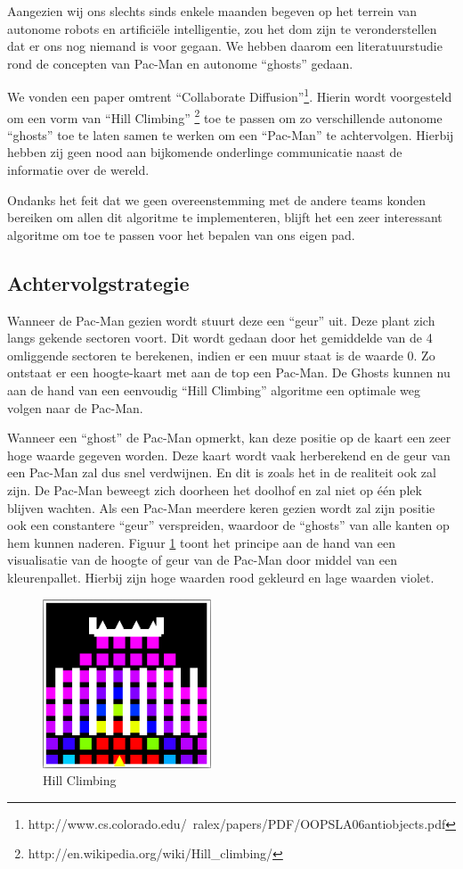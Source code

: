 \documentclass[12pt,a4paper]{report}
\begin{document}
Aangezien wij ons slechts sinds enkele maanden begeven op het terrein van autonome robots en artifici\"ele intelligentie, zou het dom zijn te veronderstellen dat er ons nog niemand is voor gegaan. We hebben daarom een literatuurstudie rond de concepten van Pac-Man en autonome ``ghosts'' gedaan.

We vonden een paper omtrent ``Collaborate Diffusion''\footnote{http://www.cs.colorado.edu/~ralex/papers/PDF/OOPSLA06antiobjects.pdf}. Hierin wordt voorgesteld om een vorm van ``Hill Climbing'' \footnote{http://en.wikipedia.org/wiki/Hill\_climbing/} toe te passen om zo verschillende autonome ``ghosts'' toe te laten samen te werken om een ``Pac-Man'' te achtervolgen. Hierbij hebben zij geen nood aan bijkomende onderlinge communicatie naast de informatie over de wereld.

Ondanks het feit dat we geen overeenstemming met de andere teams konden bereiken om allen dit algoritme te implementeren, blijft het een zeer interessant algoritme om toe te passen voor het bepalen van ons eigen pad.

\subsection{Achtervolgstrategie}

Wanneer de Pac-Man gezien wordt stuurt deze een ``geur'' uit. Deze plant zich langs gekende sectoren voort. Dit wordt gedaan door het gemiddelde van de 4 omliggende sectoren te berekenen, indien er een muur staat is de waarde 0. Zo ontstaat er een hoogte-kaart met aan de top een Pac-Man. De Ghosts kunnen nu aan de hand van een eenvoudig ``Hill Climbing'' algoritme een optimale weg volgen naar de Pac-Man.

Wanneer een ``ghost'' de Pac-Man opmerkt, kan deze positie op de kaart een zeer hoge waarde gegeven worden. Deze kaart wordt vaak herberekend en de geur van een Pac-Man zal dus snel verdwijnen. En dit is zoals het in de realiteit ook zal zijn. De Pac-Man beweegt zich doorheen het doolhof en zal niet op \'e\'en plek blijven wachten. Als een Pac-Man meerdere keren gezien wordt zal zijn positie ook een constantere ``geur'' verspreiden, waardoor de ``ghosts'' van alle kanten op hem kunnen naderen. Figuur \ref{fig:hillclimbing1} toont het principe aan de hand van een visualisatie van de hoogte of geur van de Pac-Man door middel van een kleurenpallet. Hierbij zijn hoge waarden rood gekleurd en lage waarden violet.

\begin{figure}[htbp]
  \centering
  \includegraphics[width=50mm]{resources/hillclimbing1.png}
  \caption{Hill Climbing}
  \label{fig:hillclimbing1}
\end{figure}
\end{document}

